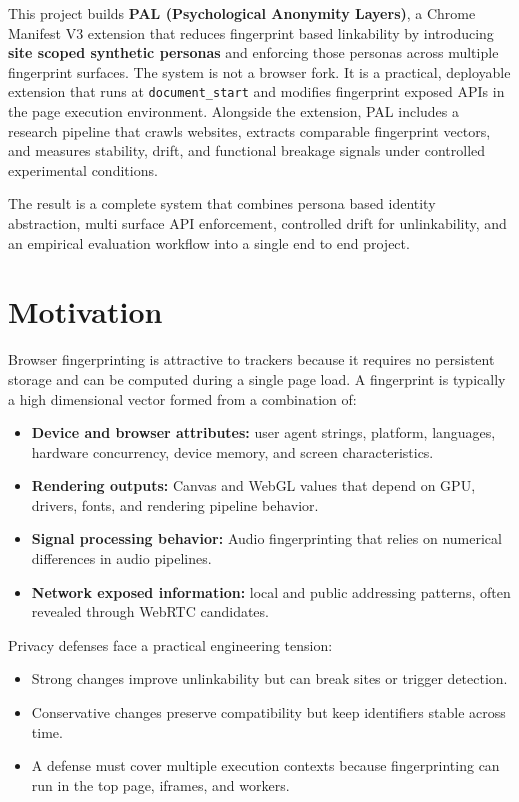 \documentclass[11pt]{report}
\begin{document}
This project builds \textbf{PAL (Psychological Anonymity Layers)}, a Chrome Manifest V3 extension that reduces fingerprint based linkability by introducing \textbf{site scoped synthetic personas} and enforcing those personas across multiple fingerprint surfaces. The system is not a browser fork. It is a practical, deployable extension that runs at \texttt{document\_start} and modifies fingerprint exposed APIs in the page execution environment. Alongside the extension, PAL includes a research pipeline that crawls websites, extracts comparable fingerprint vectors, and measures stability, drift, and functional breakage signals under controlled experimental conditions.

The result is a complete system that combines persona based identity abstraction, multi surface API enforcement, controlled drift for unlinkability, and an empirical evaluation workflow into a single end to end project.

\section{Motivation}

Browser fingerprinting is attractive to trackers because it requires no persistent storage and can be computed during a single page load. A fingerprint is typically a high dimensional vector formed from a combination of:

\begin{itemize}
    \item \textbf{Device and browser attributes:} user agent strings, platform, languages, hardware concurrency, device memory, and screen characteristics.
    \item \textbf{Rendering outputs:} Canvas and WebGL values that depend on GPU, drivers, fonts, and rendering pipeline behavior.
    \item \textbf{Signal processing behavior:} Audio fingerprinting that relies on numerical differences in audio pipelines.
    \item \textbf{Network exposed information:} local and public addressing patterns, often revealed through WebRTC candidates.
\end{itemize}

Privacy defenses face a practical engineering tension:

\begin{itemize}
    \item Strong changes improve unlinkability but can break sites or trigger detection.
    \item Conservative changes preserve compatibility but keep identifiers stable across time.
    \item A defense must cover multiple execution contexts because fingerprinting can run in the top page, iframes, and workers.
\end{itemize}
\end{document}
